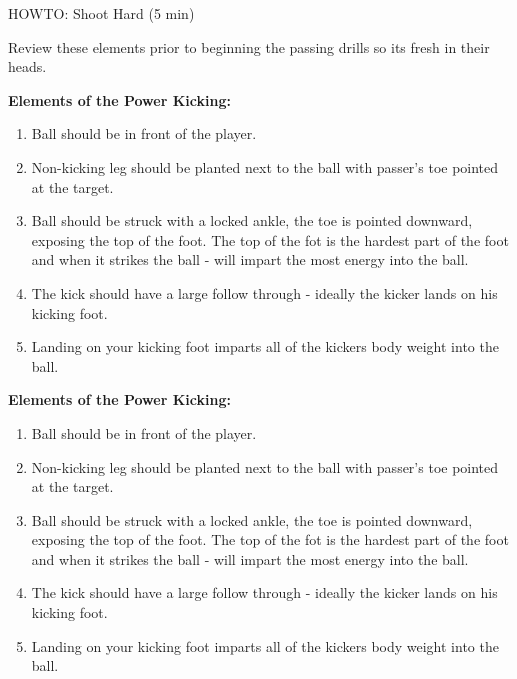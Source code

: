 \begin{evenBlock}{HOWTO:  Shoot Hard (5 min)}

\begin{minipage}[t]{\linewidth}
    \centering
    Review these elements prior to beginning the passing drills so its fresh in their heads.

    
        \textbf{Elements of the Power Kicking:}
    
        \begin{enumerate}
        \setlength{\itemsep}{0pt}
        \setlength{\parskip}{0pt}
        \setlength{\parsep}{0pt}
        \item Ball should be in front of the player.
        \item Non-kicking leg should be planted next to the ball with passer's toe pointed at the target.
        \item Ball should be struck with a locked ankle, the toe is pointed downward, exposing the top of the foot.  The top of the fot is the hardest part of the foot and when it strikes the ball - will impart the most energy into the ball.
        \item The kick should have a large follow through - ideally the kicker lands on his kicking foot.
        \item Landing on your kicking foot imparts all of the kickers body weight into the ball.
        \end{enumerate}
        
        \textbf{Elements of the Power Kicking:}
    
        \begin{enumerate}
        \setlength{\itemsep}{0pt}
        \setlength{\parskip}{0pt}
        \setlength{\parsep}{0pt}
        \item Ball should be in front of the player.
        \item Non-kicking leg should be planted next to the ball with passer's toe pointed at the target.
        \item Ball should be struck with a locked ankle, the toe is pointed downward, exposing the top of the foot.  The top of the fot is the hardest part of the foot and when it strikes the ball - will impart the most energy into the ball.
        \item The kick should have a large follow through - ideally the kicker lands on his kicking foot.
        \item Landing on your kicking foot imparts all of the kickers body weight into the ball.
        \end{enumerate}
\end{minipage}

\end{evenBlock}